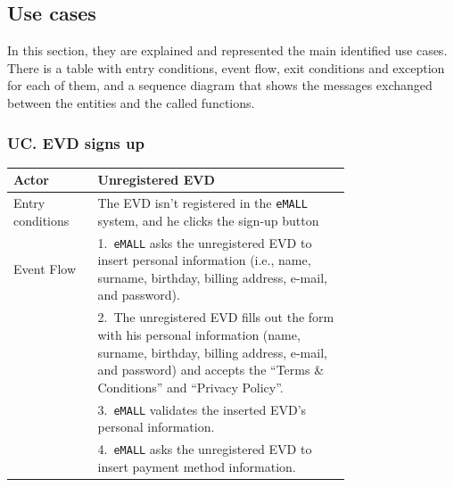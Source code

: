\subsection{Use cases}
\label{subsec: use_cases}%
\setcounter{uc}{1}
\newcommand{\cuc}{\theuc\stepcounter{uc}}
In this section, they are explained and represented the main identified use cases.
There is a table with entry conditions, event flow, exit conditions and exception for each of them, and a sequence diagram
that shows the messages exchanged between the entities and the called functions. \\
\subsubsection*{UC\cuc . EVD signs up}
\begin{center}
    \begin{longtable}{lp{0.75\linewidth}}
        \hline
        Actor            & Unregistered EVD                                                                                                                                                                                       \\
        \hline
        Entry conditions & The EVD isn’t registered in the \verb|eMALL| system, and he clicks the sign-up button                                                                                                                         \\
        \hline
        Event Flow       & 1.\ \verb|eMALL| asks the unregistered EVD to insert personal information (i.e., name, surname, birthday, billing address, e-mail, and password).                                                             \\
        & 2.\ The unregistered EVD fills out the form with his personal information (name, surname, birthday, billing address, e-mail, and password) and accepts the “Terms \& Conditions” and “Privacy Policy”. \\
        & 3.\ \verb|eMALL| validates the inserted EVD’s personal information.                                                                                                                                           \\
        & 4.\ \verb|eMALL| asks the unregistered EVD to insert payment method information.                                                                                                                              \\

\end{longtable}
\end{center}
